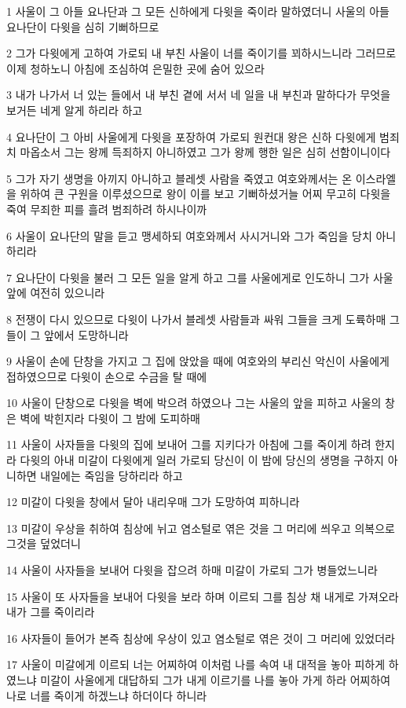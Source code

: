 \par 1 사울이 그 아들 요나단과 그 모든 신하에게 다윗을 죽이라 말하였더니 사울의 아들 요나단이 다윗을 심히 기뻐하므로
\par 2 그가 다윗에게 고하여 가로되 내 부친 사울이 너를 죽이기를 꾀하시느니라 그러므로 이제 청하노니 아침에 조심하여 은밀한 곳에 숨어 있으라
\par 3 내가 나가서 너 있는 들에서 내 부친 곁에 서서 네 일을 내 부친과 말하다가 무엇을 보거든 네게 알게 하리라 하고
\par 4 요나단이 그 아비 사울에게 다윗을 포장하여 가로되 원컨대 왕은 신하 다윗에게 범죄치 마옵소서 그는 왕께 득죄하지 아니하였고 그가 왕께 행한 일은 심히 선함이니이다
\par 5 그가 자기 생명을 아끼지 아니하고 블레셋 사람을 죽였고 여호와께서는 온 이스라엘을 위하여 큰 구원을 이루셨으므로 왕이 이를 보고 기뻐하셨거늘 어찌 무고히 다윗을 죽여 무죄한 피를 흘려 범죄하려 하시나이까
\par 6 사울이 요나단의 말을 듣고 맹세하되 여호와께서 사시거니와 그가 죽임을 당치 아니하리라
\par 7 요나단이 다윗을 불러 그 모든 일을 알게 하고 그를 사울에게로 인도하니 그가 사울 앞에 여전히 있으니라
\par 8 전쟁이 다시 있으므로 다윗이 나가서 블레셋 사람들과 싸워 그들을 크게 도륙하매 그들이 그 앞에서 도망하니라
\par 9 사울이 손에 단창을 가지고 그 집에 앉았을 때에 여호와의 부리신 악신이 사울에게 접하였으므로 다윗이 손으로 수금을 탈 때에
\par 10 사울이 단창으로 다윗을 벽에 박으려 하였으나 그는 사울의 앞을 피하고 사울의 창은 벽에 박힌지라 다윗이 그 밤에 도피하매
\par 11 사울이 사자들을 다윗의 집에 보내어 그를 지키다가 아침에 그를 죽이게 하려 한지라 다윗의 아내 미갈이 다윗에게 일러 가로되 당신이 이 밤에 당신의 생명을 구하지 아니하면 내일에는 죽임을 당하리라 하고
\par 12 미갈이 다윗을 창에서 달아 내리우매 그가 도망하여 피하니라
\par 13 미갈이 우상을 취하여 침상에 뉘고 염소털로 엮은 것을 그 머리에 씌우고 의복으로 그것을 덮었더니
\par 14 사울이 사자들을 보내어 다윗을 잡으려 하매 미갈이 가로되 그가 병들었느니라
\par 15 사울이 또 사자들을 보내어 다윗을 보라 하며 이르되 그를 침상 채 내게로 가져오라 내가 그를 죽이리라
\par 16 사자들이 들어가 본즉 침상에 우상이 있고 염소털로 엮은 것이 그 머리에 있었더라
\par 17 사울이 미갈에게 이르되 너는 어찌하여 이처럼 나를 속여 내 대적을 놓아 피하게 하였느냐 미갈이 사울에게 대답하되 그가 내게 이르기를 나를 놓아 가게 하라 어찌하여 나로 너를 죽이게 하겠느냐 하더이다 하니라
